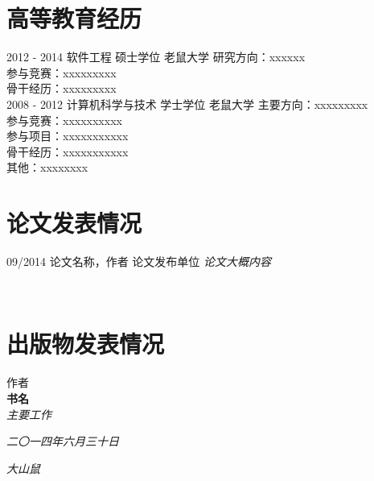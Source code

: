 \documentclass[]{friggeri-cv}
\begin{document}
\section{\cuti 高等教育经历}
\begin{entrylist}
  \entry
    {2012 - 2014}
    {\cuti 软件工程 硕士学位}
    {老鼠大学}
    {研究方向：xxxxxx\\
    参与竞赛：xxxxxxxxx\\
    骨干经历：xxxxxxxxx
\\}
  \entry
    {2008 - 2012}
    {\cuti 计算机科学与技术 学士学位}
    {老鼠大学}
    {主要方向：xxxxxxxxx\\
    参与竞赛：xxxxxxxxxx\\
    参与项目：xxxxxxxxxxx\\
    骨干经历：xxxxxxxxxxx\\
    其他：xxxxxxxx
  \\}
\end{entrylist}

\section{\cuti 论文发表情况}
\begin{entrylist}
  \entry
    {09/2014}
    {\cuti 论文名称，作者}
    {论文发布单位}
    {\emph{论文大概内容}}
\end{entrylist}\\

\section{\cuti 出版物发表情况}
作者\\
\textbf{书名}\\
\emph{主要工作}
\\

\vspace{40pt}

\begin{flushright}
\emph{二〇一四年六月三十日}
\end{flushright}
\begin{flushright}
\emph{大山鼠}
\end{flushright}

% 
\end{document}
